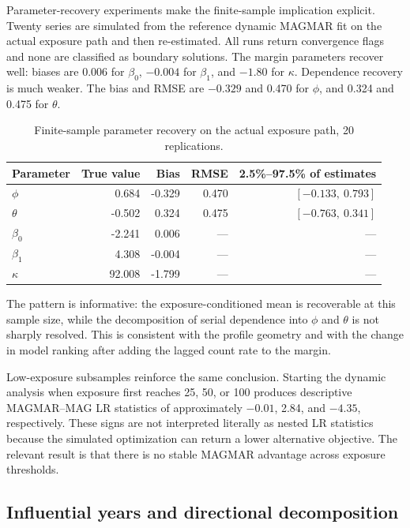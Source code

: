 \documentclass[11pt]{article}
\theoremstyle{definition}
\begin{document}
Parameter-recovery experiments make the finite-sample implication explicit. Twenty
series are simulated from the reference dynamic MAGMAR fit on the actual exposure
path and then re-estimated. All runs return convergence flags and none are classified
as boundary solutions. The margin parameters recover well: biases are 0.006 for
$\beta_0$, $-0.004$ for $\beta_1$, and $-1.80$ for $\kappa$. Dependence recovery is
much weaker. The bias and RMSE are $-0.329$ and 0.470 for $\phi$, and 0.324 and
0.475 for $\theta$.

\begin{table}[t]
\centering
\caption{Finite-sample parameter recovery on the actual exposure path, 20 replications.}
\label{tab:recovery}
\begin{tabular}{lrrrr}
\toprule
Parameter & True value & Bias & RMSE & 2.5\%--97.5\% of estimates \\
\midrule
$\phi$   & 0.684 & -0.329 & 0.470 & $[-0.133,\ 0.793]$ \\
$\theta$ & -0.502 & 0.324 & 0.475 & $[-0.763,\ 0.341]$ \\
$\beta_0$ & -2.241 & 0.006 & --- & --- \\
$\beta_1$ & 4.308 & -0.004 & --- & --- \\
$\kappa$  & 92.008 & -1.799 & --- & --- \\
\bottomrule
\end{tabular}
\end{table}

The pattern is informative: the exposure-conditioned mean is recoverable at this
sample size, while the decomposition of serial dependence into $\phi$ and $\theta$
is not sharply resolved. This is consistent with the profile geometry and with the
change in model ranking after adding the lagged count rate to the margin.

Low-exposure subsamples reinforce the same conclusion. Starting the dynamic analysis
when exposure first reaches 25, 50, or 100 produces descriptive MAGMAR--MAG LR
statistics of approximately $-0.01$, 2.84, and $-4.35$, respectively. These signs
are not interpreted literally as nested LR statistics because the simulated
optimization can return a lower alternative objective. The relevant result is that
there is no stable MAGMAR advantage across exposure thresholds.

\subsection{Influential years and directional decomposition}
\end{document}
